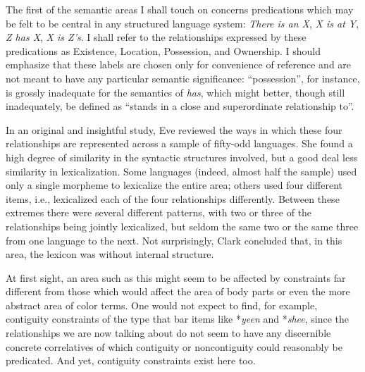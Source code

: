 The first of the semantic areas I shall touch on concerns predications which may be felt to be central in any structured language system: \textit{There is an X}, \textit{X is at Y}, \textit{Z has X}, \textit{X is Z's}. I shall refer to the relationships expressed by these predications as Existence, Location, Possession, and Ownership. I should emphasize that these labels are chosen only for convenience of reference and are not meant to have any particular semantic significance: ``possession'', for instance, is grossly inadequate for the semantics of \textit{has}, which might better, though still inadequately, be defined as ``stands in a close and superordinate relationship to''.

In an original and insightful study, Eve \citet{Clark1970} reviewed the ways in which these four relationships are represented across a sample of fifty-odd languages. She found a high degree of similarity in the syntactic structures involved, but a good deal less similarity in lexicalization. Some languages (indeed, almost half the sample) used only a single morpheme to lexicalize the entire area; others used four different items, i.e., lexicalized each of the four relationships differently. Between these extremes there were several different patterns, with two or three of the relationships being jointly lexicalized, but seldom the same two or the same three from one language to the next. Not surprisingly, Clark concluded that, in this area, the lexicon was without internal structure.

At first sight, an area such as this might seem to be affected by constraints far different from those which would affect the area of 
body parts or even the more abstract area of color terms. One would not expect to find, for example, contiguity constraints of the type that bar items like *\textit{yeen} and *\textit{shee}, since the relationships we are now talking about do not seem to have any discernible concrete correlatives of which contiguity or noncontiguity could reasonably be predicated. And yet, contiguity constraints exist here too.

